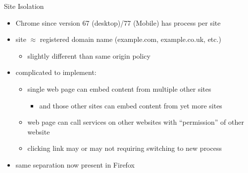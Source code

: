 
\begin{frame}{Site Isolation}
\begin{itemize}
\item Chrome since version 67 (desktop)/77 (Mobile) has process per site
\item site $\approx$ registered domain name (example.com, example.co.uk, etc.)
    \begin{itemize}
    \item slightly different than same origin policy
    \end{itemize}
\item complicated to implement:
    \begin{itemize}
    \item single web page can embed content from multiple other sites
        \begin{itemize}
        \item and those other sites can embed content from yet more sites
        \end{itemize}
    \item web page can call services on other websites with ``permission'' of other website
    \item clicking link may or may not requiring switching to new process
    \end{itemize}
\item same separation now present in Firefox
\end{itemize}
\end{frame}

